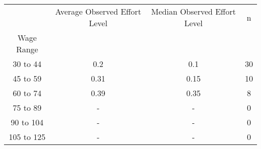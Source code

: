 \begin{tabular}{cccc}
\toprule
{} & Average Observed Effort Level & Median Observed Effort Level &   n \\
Wage Range &                               &                              &     \\
\midrule
30 to 44   &                           0.2 &                          0.1 &  30 \\
45 to 59   &                          0.31 &                         0.15 &  10 \\
60 to 74   &                          0.39 &                         0.35 &   8 \\
75 to 89   &                             - &                            - &   0 \\
90 to 104  &                             - &                            - &   0 \\
105 to 125 &                             - &                            - &   0 \\
\bottomrule
\end{tabular}

